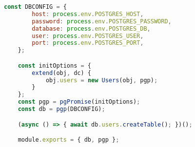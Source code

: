 \begin{lstlisting}[language=JavaScript,caption={Express.js database connection},breaklines=true,label={lst:expressDbConnection}]
    const DBCONFIG = {
        host: process.env.POSTGRES_HOST,
        password: process.env.POSTGRES_PASSWORD,
        database: process.env.POSTGRES_DB,
        user: process.env.POSTGRES_USER,
        port: process.env.POSTGRES_PORT,
    };

    const initOptions = {
        extend(obj, dc) {
            obj.users = new Users(obj, pgp);
        }
    };
    const pgp = pgPromise(initOptions);
    const db = pgp(DBCONFIG);

    (async () => { await db.users.createTable(); })();

    module.exports = { db, pgp };
\end{lstlisting}
